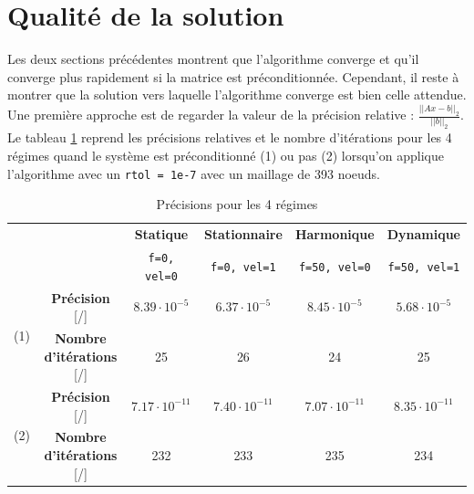 \documentclass[11pt]{article}
\begin{document}
\section{Qualité de la solution}\label{qualitysec}
\vspace{-8pt}
Les deux sections précédentes montrent que l'algorithme converge et qu'il converge plus rapidement si la matrice est préconditionnée. Cependant, il reste à montrer que la solution vers laquelle l'algorithme converge est bien celle attendue. Une première approche est de regarder la valeur de la précision relative : $\frac{||Ax - b||_2}{||b||_2}$. Le tableau \ref{regimescomp} reprend les précisions relatives et le nombre d'itérations pour les 4 régimes quand le système est préconditionné (1) ou pas (2) lorsqu'on applique l'algorithme avec un \texttt{rtol = 1e-7} avec un maillage de 393 noeuds. \\
\vspace{-12pt}
\begin{table}[h!]
\centering
\begin{tabular}{|c|c||c|c|c|c|}
    \hline
     \multicolumn{2}{|c||}{}   & \textbf{Statique} & \textbf{Stationnaire} & \textbf{Harmonique} & \textbf{Dynamique} \\
     \multicolumn{2}{|c||}{}   & \texttt{f=0, vel=0} & \texttt{f=0, vel=1} & \texttt{f=50, vel=0} & \texttt{f=50, vel=1} \\
    \hline
    \multirow{2}{*}{(1)} & \textbf{Précision} [/] & $8.39 \cdot 10^{-5}$  & $6.37 \cdot 10^{-5}$  & $8.45 \cdot 10^{-5}$  & $5.68 \cdot 10^{-5}$ \\ \cline{2-6}
    & \textbf{Nombre d'itérations} [/] & 25 & 26  &  24 & 25\\
    \hline
    \multirow{2}{*}{(2)} & \textbf{Précision} [/] & $7.17 \cdot 10^{-11}$ & $7.40 \cdot 10^{-11}$ & $7.07 \cdot 10^{-11}$ & $8.35 \cdot 10^{-11}$\\ \cline{2-6}
    & \textbf{Nombre d'itérations} [/] & 232  & 233 & 235 & 234\\
    \hline
\end{tabular}
\caption{Précisions pour les 4 régimes}
\label{regimescomp}
\end{table}
\vspace{-10pt}
\end{document}

